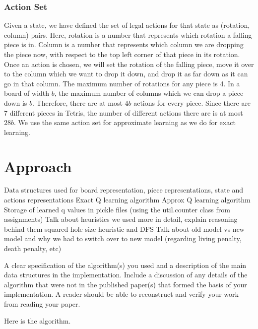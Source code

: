 \documentclass[11pt]{article}
\begin{document}
\subsubsection{Action Set}
Given a state, we have defined the set of legal actions for that state as (rotation, column) pairs. Here, rotation is a number that represents which rotation a falling piece is in. Column is a number that represents which column we are dropping the piece now, with respect to the top left corner of that piece in its rotation. Once an action is chosen, we will set the rotation of the falling piece, move it over to the column which we want to drop it down, and drop it as far down as it can go in that column. The maximum number of rotations for any piece is 4. In a board of width $b$, the maximum number of columns which we can drop a piece down is  $b$. Therefore, there are at most $4b$ actions for every piece. Since there are 7 different pieces in Tetris, the number of different actions there are is at most $28b$. We use the same action set for approximate learning as we do for exact learning.

\section{Approach}

Data structures used for board representation, piece representations, state and actions representations
Exact Q learning algorithm
Approx Q learning algorithm
Storage of learned q values in pickle files (using the util.counter class from assignments)
Talk about heuristics we used more in detail, explain reasoning behind them
squared hole size heuristic and DFS
Talk about old model vs new model and why we had to switch over to new model (regarding living penalty, death penalty, etc)


A clear specification of the algorithm(s) you used and a description
of the main data structures in the implementation. Include a
discussion of any details of the algorithm that were not in the
published paper(s) that formed the basis of your implementation. A
reader should be able to reconstruct and verify your work from reading
your paper.

\begin{algorithm}
  \begin{algorithmic}
    \EndProcedure{}
  \end{algorithmic}
  \caption{Here is the algorithm.}
\end{algorithm}
\end{document}
